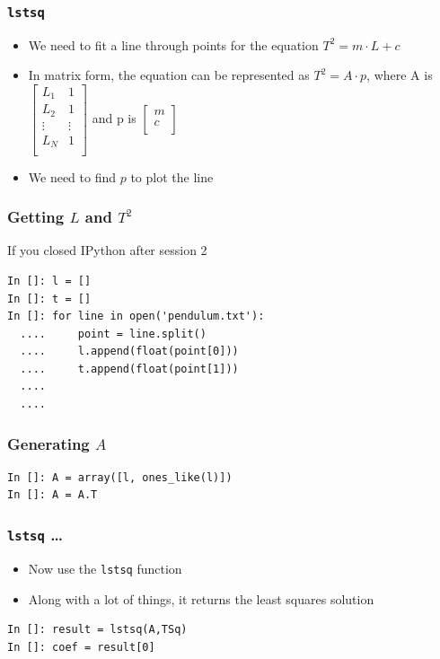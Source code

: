 \documentclass[14pt,compress]{beamer}
\newcommand{\typ}[1]{\lstinline{#1}}
\begin{document}
\begin{frame}[fragile]
\frametitle{\typ{lstsq}}
\begin{itemize}
\item We need to fit a line through points for the equation $T^2 = m \cdot L+c$
\item In matrix form, the equation can be represented as $T^2 = A \cdot p$, where A is   
  $\begin{bmatrix}
  L_1 & 1 \\
  L_2 & 1 \\
  \vdots & \vdots\\
  L_N & 1 \\
  \end{bmatrix}$
  and p is 
  $\begin{bmatrix}
  m\\
  c\\
  \end{bmatrix}$
\item We need to find $p$ to plot the line
\end{itemize}
\end{frame}

\begin{frame}[fragile]
\frametitle{Getting $L$ and $T^2$}
If you \alert{closed} IPython after session 2
\begin{lstlisting}
In []: l = []
In []: t = []
In []: for line in open('pendulum.txt'):
  ....     point = line.split()
  ....     l.append(float(point[0]))
  ....     t.append(float(point[1]))
  ....
  ....
\end{lstlisting}
\end{frame}
 
\begin{frame}[fragile]
\frametitle{Generating $A$}
\begin{lstlisting}
In []: A = array([l, ones_like(l)])
In []: A = A.T
\end{lstlisting}
\end{frame}

\begin{frame}[fragile]
\frametitle{\typ{lstsq} \ldots}
\begin{itemize}
\item Now use the \typ{lstsq} function
\item Along with a lot of things, it returns the least squares solution
\end{itemize}
\begin{lstlisting}
In []: result = lstsq(A,TSq)
In []: coef = result[0]
\end{lstlisting}
\end{frame}
\end{document}

